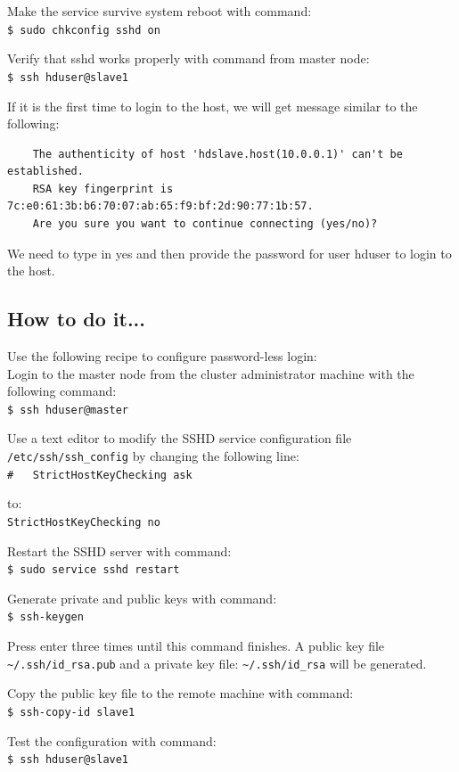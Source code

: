 Make the service survive system reboot with command: \\
\verb|$ sudo chkconfig sshd on|

Verify that sshd works properly with command from master node: \\
\verb|$ ssh hduser@slave1|

If it is the first time to login to the host, we will get message similar to the following:
\begin{verbatim}
    The authenticity of host 'hdslave.host(10.0.0.1)' can't be established.
    RSA key fingerprint is 7c:e0:61:3b:b6:70:07:ab:65:f9:bf:2d:90:77:1b:57.
    Are you sure you want to continue connecting (yes/no)?
\end{verbatim}

We need to type in yes and then provide the password for user hduser to login to the host.
\subsection*{How to do it...}
Use the following recipe to configure password-less login: \\
Login to the master node from the cluster administrator machine with the following command: \\
\verb|$ ssh hduser@master|

Use a text editor to modify the SSHD service configuration file \verb|/etc/ssh/ssh_config| by changing the following line: \\
\verb|#   StrictHostKeyChecking ask|

to: \\
\verb|StrictHostKeyChecking no|

Restart the SSHD server with command: \\
\verb|$ sudo service sshd restart|

Generate private and public keys with command: \\
\verb|$ ssh-keygen|

Press enter three times until this command finishes. A public key file \verb|~/.ssh/id_rsa.pub| and a private key file: \verb|~/.ssh/id_rsa| will be generated.

Copy the public key file to the remote machine with command: \\
\verb|$ ssh-copy-id slave1|

Test the configuration with command: \\
\verb|$ ssh hduser@slave1|

